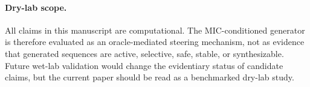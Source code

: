 \paragraph{Dry-lab scope.}
All claims in this manuscript are computational. The MIC-conditioned generator is
therefore evaluated as an oracle-mediated steering mechanism, not as evidence
that generated sequences are active, selective, safe, stable, or synthesizable.
Future wet-lab validation would change the evidentiary status of candidate
claims, but the current paper should be read as a benchmarked dry-lab study.
